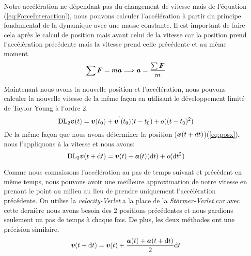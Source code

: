         Notre accélération ne dépendant pas du changement de vitesse mais de l'équation (\ref{eq:ForceInteraction}), nous pouvons calculer l'accélération à partir du principe fondamental de la dynamique avec une masse constante. Il est important de faire cela après le calcul de position mais avant celui de la vitesse car la position prend l'accélération précédente mais la vitesse prend celle précédente et au même moment.
        \begin{equation}
            \label{PFD}
            \sum  \vb*{F} = m\vb*{a} \Longrightarrow \vb*{a} = \frac{\sum \vb*{F}}{m}
        \end{equation}

        Maintenant nous avons la nouvelle position et l'accélération, nous pouvons calculer la nouvelle vitesse de la même façon en utilisant le développement limité de Taylor Young à l'ordre 2.%
        \begin{equation}
            \mathrm{DL}_2\vb*{v}(t) = \vb*{v}(t_0) + \vb*{v}^{'}(t_0)(t-t_0) + o((t-t_0)^2)
        \end{equation}
        De la même façon que nous avons déterminer la position ($\vb*{x}(t+dt)$)(\ref{eq:posx}), nous l'appliquons à la vitesse et nous avons:
        \begin{equation}
            \mathrm{DL}_2\vb*{v}(t+\mathrm{d}t) = \vb*{v}(t) + \vb*{a}(t)(\mathrm{d}t) + o(\mathrm{d}t^2)
        \end{equation}

        Comme nous connaissons l'accélération au pas de temps suivant et précédent en même temps, nous pouvons avoir une meilleure approximation de notre vitesse en prenant le point au milieu au lieu de prendre uniquement l'accélération précédente. On utilise la \textit{velocity-Verlet} a la place de la \textit{Störmer-Verlet} car avec cette dernière nous avons besoin des 2 positions précédentes et nous gardions seulement un pas de temps à chaque fois. De plus, les deux méthodes ont une précision similaire.
        \begin{equation}
            \label{eq:verletVitesse}
            \vb*{v}(t+\mathrm{d}t) = \vb*{v}(t)+\frac{\vb*{a}(t)+\vb*{a}(t+\mathrm{d}t)}{2}\mathrm{d}t 
        \end{equation}

